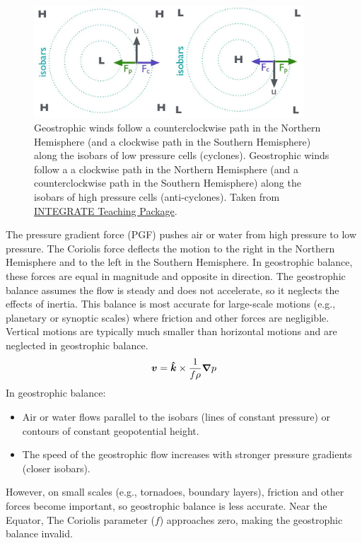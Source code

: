 \begin{figure}
	\centering
	\includegraphics[width=0.9\textwidth]{figs/geostrophic-balance}
	\caption{
		Geostrophic winds follow a counterclockwise path in the Northern Hemisphere (and a clockwise path in the Southern Hemisphere) along the isobars of low pressure cells (cyclones).
		Geostrophic winds follow a a clockwise path in the Northern Hemisphere (and a counterclockwise path in the Southern Hemisphere) along the isobars of high pressure cells (anti-cyclones).
		Taken from \href{http://integrate.mutz.science}{INTEGRATE Teaching Package}.}
	\label{fig:geostrophic-balance}
\end{figure}
The pressure gradient force (PGF) pushes air or water from high pressure to low pressure. The Coriolis force deflects the motion to the right in the Northern Hemisphere and to the left in the Southern Hemisphere. In geostrophic balance, these forces are equal in magnitude and opposite in direction. The geostrophic balance assumes the flow is steady and does not accelerate, so it neglects the effects of inertia. This balance is most accurate for large-scale motions (e.g., planetary or synoptic scales) where friction and other forces are negligible. Vertical motions are typically much smaller than horizontal motions and are neglected in geostrophic balance.
\begin{equation}
	\vec{v} = \unitv{k} \times \frac{1}{f \rho} \grad p
\end{equation}
In geostrophic balance:
\begin{itemize}
	\item Air or water flows parallel to the isobars (lines of constant pressure) or contours of constant geopotential height.
	\item The speed of the geostrophic flow increases with stronger pressure gradients (closer isobars).
\end{itemize}
However, on small scales (e.g., tornadoes, boundary layers), friction and other forces become important, so geostrophic balance is less accurate. Near the Equator, The Coriolis parameter ($f$) approaches zero, making the geostrophic balance invalid.

